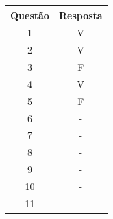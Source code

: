 \documentclass[12pt]{article}
\begin{document}
\begin{table}[H]
      \begin{tabular}{|c|c|} \hline
      \textbf{Questão} & \textbf{Resposta}\\
      \hline
      1  & V \\ \hline
      2  & V \\ \hline
      3  & F \\ \hline
      4  & V \\ \hline
      5  & F \\ \hline
      6  & - \\ \hline
      7  & - \\ \hline
      8  & - \\ \hline
      9  & - \\ \hline
      10 & - \\ \hline
      11 & - \\ \hline
      \end{tabular}
\end{table}
\end{document}
